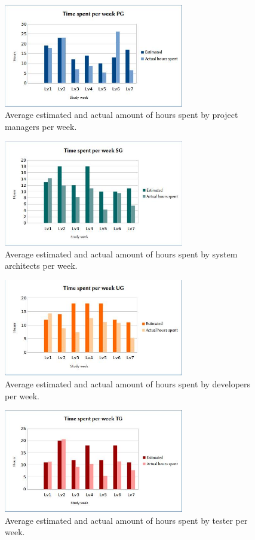 \documentclass[a4paper]{article}
\begin{document}
\begin{figure}[h!]
\centering
\includegraphics[width=0.7\textwidth]{pg.jpg}
\caption{Average estimated and actual amount of hours spent by project managers per week.}
\label{fig:pg}
\end{figure}

\begin{figure}[h!]
\centering
\includegraphics[width=0.7\textwidth]{sg.jpg}
\caption{Average estimated and actual amount of hours spent by system architects per week.}
\label{fig:sg}
\end{figure}

\begin{figure}[h!]
\centering
\includegraphics[width=0.7\textwidth]{ug.jpg}
\caption{Average estimated and actual amount of hours spent by developers per week.}
\label{fig:ug}
\end{figure}

\begin{figure}[h!]
\centering
\includegraphics[width=0.7\textwidth]{tg.jpg}
\caption{Average estimated and actual amount of hours spent by tester per week.}
\label{fig:tg}
\end{figure}
\end{document}
